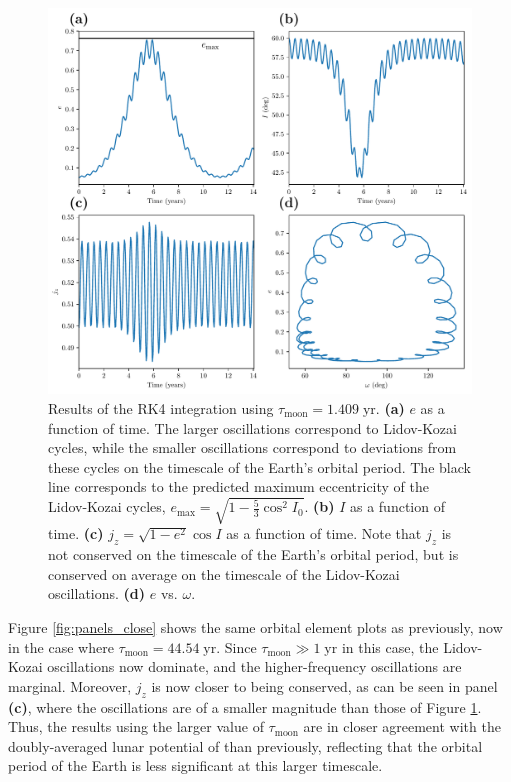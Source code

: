 \documentclass[11pt]{article}
\begin{document}
\begin{figure}[h!]
    \centering
    \includegraphics[width=\textwidth]{plots/figure1.pdf}
    \caption{Results of the RK4 integration using $\tau_\mathrm{moon} = 1.409 \; \mathrm{yr}$. \textbf{(a)} $e$ as a function of time. The larger oscillations correspond to Lidov-Kozai cycles, while the smaller oscillations correspond to deviations from these cycles on the timescale of the Earth's orbital period. The black line corresponds to the predicted maximum eccentricity of the Lidov-Kozai cycles, $e_\mathrm{max} = \sqrt{1 - \tfrac{5}{3} \cos^2 I_0}$. \textbf{(b)} $I$ as a function of time. \textbf{(c)} $j_z = \sqrt{1-e^2} \cos I$ as a function of time. Note that $j_z$ is not conserved on the timescale of the Earth's orbital period, but is conserved on average on the timescale of the Lidov-Kozai oscillations. \textbf{(d)} $e$ vs. $\omega$.}
    \label{fig:panels}
\end{figure}

Figure \ref{fig:panels_close} shows the same orbital element plots as previously, now in the case where $\tau_{\mathrm{moon}} = 44.54 \; \mathrm{yr}$. Since $\tau_\mathrm{moon} \gg 1 \; \mathrm{yr}$ in this case, the Lidov-Kozai oscillations now dominate, and the higher-frequency oscillations are marginal. Moreover, $j_z$ is now closer to being conserved, as can be seen in panel \textbf{(c)}, where the oscillations are of a smaller magnitude than those of Figure \ref{fig:panels}. Thus, the results using the larger value of $\tau_{\mathrm{moon}}$ are in closer agreement with the doubly-averaged lunar potential of \textcite{tremaine2014} than previously, reflecting that the orbital period of the Earth is less significant at this larger timescale.
\end{document}
